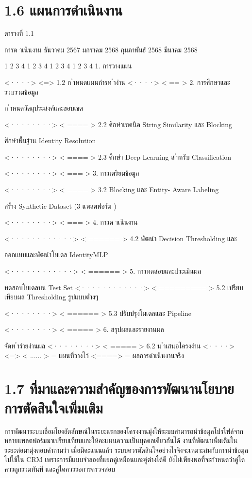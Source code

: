 \documentclass[12pt,a4paper]{report}
\begin{document}
\section*{1.6 แผนการดำเนินงาน}
\begin{center}\small ตารางที่ 1.1\end{center}
การด าเนินงาน ธันวาคม 2567 มกราคม 2568 กุมภาพันธ์ 2568 มีนาคม 2568\par
1 2 3 4 1 2 3 4 1 2 3 4 1 2 3 4 1. การวางแผน\par
<····> <=> 1.2 ก ำหนดแผนกำรท ำงำน <····> < == > 2. การศึกษาและรวบรวมข้อมูล\par
{} ก ำหนดวัตถุประสงค์และขอบเขต\par
<········> < ==== > 2.2 ศึกษำเทคนิค String Similarity และ Blocking\par
{} ศึกษำพื้นฐำน Identity Resolution\par
<········> < ==== > 2.3 ศึกษำ Deep Learning ส ำหรับ Classification\par
<········> < === > 3. การเตรียมข้อมูล\par
<········> < ==== > 3.2 Blocking และ Entity- Aware Labeling\par
{} สร้ำง Synthetic Dataset (3 แพลตฟอร์ม )\par
<········> < === > 4. การด าเนินงาน\par
<············> < ====== > 4.2 พัฒนำ Decision Thresholding และ\par
{} ออกแบบและพัฒนำโมเดล IdentityMLP\par
<············> < ====== > 5. การทดสอบและประเมินผล\par
{} ทดสอบโมเดลบน Test Set <············> < ========= > 5.2 เปรียบเทียบผล Thresholding รูปแบบต่ำงๆ\par
<········> < ====== > 5.3 ปรับปรุงโมเดลและ Pipeline\par
<········> < ===== > 6. สรุปผลและรายงานผล\par
{} จัดท ำรำยงำนผล <········> < ===== > 6.2 น ำเสนอโครงงำน <····> <=> < ...... > = แผนที่วางไว้ <====> = ผลการดำเนินงานจริง\par
\clearpage
\section*{1.7 ที่มาและความสำคัญของการพัฒนานโยบายการตัดสินใจเพิ่มเติม}
การพัฒนาระบบเชื่อมโยงอัตลักษณ์ในระยะแรกของโครงงานมุ่งให้ระบบสามารถนำข้อมูลโปรไฟล์จากหลายแพลตฟอร์มมาเปรียบเทียบและให้คะแนนความเป็นบุคคลเดียวกันได้ งานที่พัฒนาเพิ่มเติมในระยะต่อมามุ่งตอบคำถามว่า เมื่อมีคะแนนแล้ว ระบบควรตัดสินใจอย่างไรจึงจะเหมาะสมกับการนำข้อมูลไปใช้ใน CRM เพราะการมีแบบจำลองที่แยกคู่เหมือนและคู่ต่างได้ดี ยังไม่เพียงพอที่จะกำหนดว่าคู่ใดควรถูกรวมทันที และคู่ใดควรรอการตรวจสอบ
\end{document}
